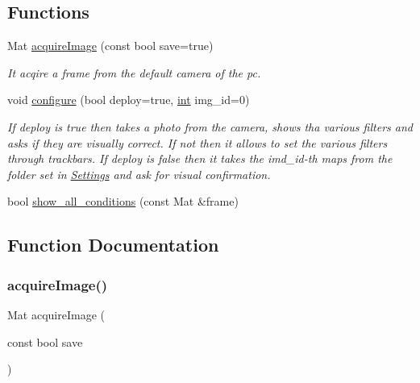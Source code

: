 \subsection*{Functions}
\begin{DoxyCompactItemize}
\item 
Mat \mbox{\hyperlink{configure_8hh_a5a8a77850effc2c4c0a518967713f94f}{acquire\+Image}} (const bool save=true)
\begin{DoxyCompactList}\small\item\em It acqire a frame from the default camera of the pc. \end{DoxyCompactList}\item 
void \mbox{\hyperlink{configure_8hh_afff3976a7e359f9c2baef0fa59f0fca0}{configure}} (bool deploy=true, \mbox{\hyperlink{draw_8hh_aa620a13339ac3a1177c86edc549fda9b}{int}} img\+\_\+id=0)
\begin{DoxyCompactList}\small\item\em If deploy is true then takes a photo from the camera, shows tha various filters and asks if they are visually correct. If not then it allows to set the various filters through trackbars. If deploy is false then it takes the imd\+\_\+id-\/th maps from the folder set in \mbox{\hyperlink{class_settings}{Settings}} and ask for visual confirmation. \end{DoxyCompactList}\item 
bool \mbox{\hyperlink{configure_8hh_a7a820e1422cbd41bba0662593fed05d8}{show\+\_\+all\+\_\+conditions}} (const Mat \&frame)
\end{DoxyCompactItemize}


\subsection{Function Documentation}
\mbox{\label{configure_8hh_a5a8a77850effc2c4c0a518967713f94f}} 
\subsubsection{\texorpdfstring{acquireImage()}{acquireImage()}}
{\footnotesize\ttfamily Mat acquire\+Image (\begin{DoxyParamCaption}\item[{const bool}]{save }\end{DoxyParamCaption})}



